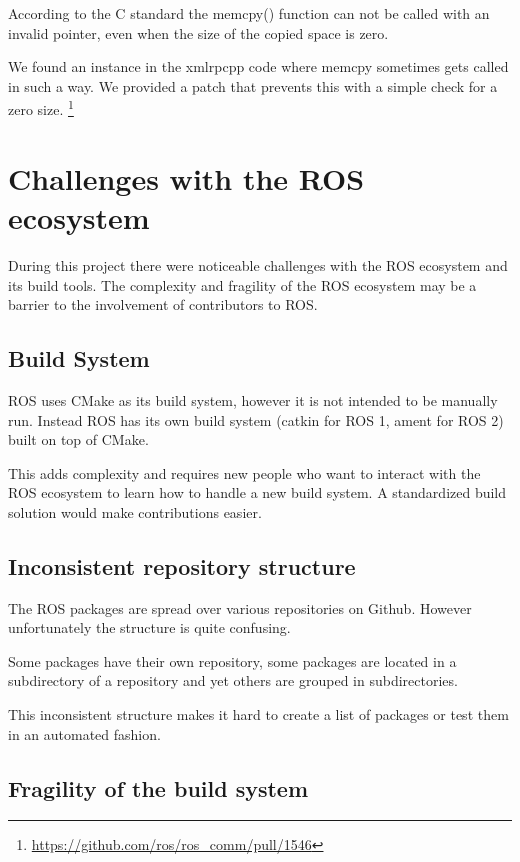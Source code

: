 \documentclass{article}
\begin{document}
According to the C standard the memcpy() function can not be called with an invalid pointer, even
when the size of the copied space is zero.

We found an instance in the xmlrpcpp code where memcpy sometimes gets called in such a way.
We provided a patch that prevents this with a simple check for a zero size. \footnote{\url{https://github.com/ros/ros_comm/pull/1546}}

\section{Challenges with the ROS ecosystem}

During this project there were noticeable challenges with the ROS ecosystem and its build tools.
The complexity and fragility of the ROS ecosystem may be a barrier to the involvement of
contributors to ROS.

\subsection{Build System}

ROS uses CMake as its build system, however it is not intended to be manually run. Instead ROS has its
own build system (catkin for ROS 1, ament for ROS 2) built on top of CMake.

This adds complexity and requires new people who want to interact with the ROS ecosystem to
learn how to handle a new build system. A standardized build solution would
make contributions easier.

\subsection{Inconsistent repository structure}

The ROS packages are spread over various repositories on Github. However unfortunately the structure
is quite confusing.

Some packages have their own repository, some packages are located in a subdirectory of a repository
and yet others are grouped in subdirectories.

This inconsistent structure makes it hard to create a list of packages or test them in an automated fashion.

\subsection{Fragility of the build system}
\end{document}

